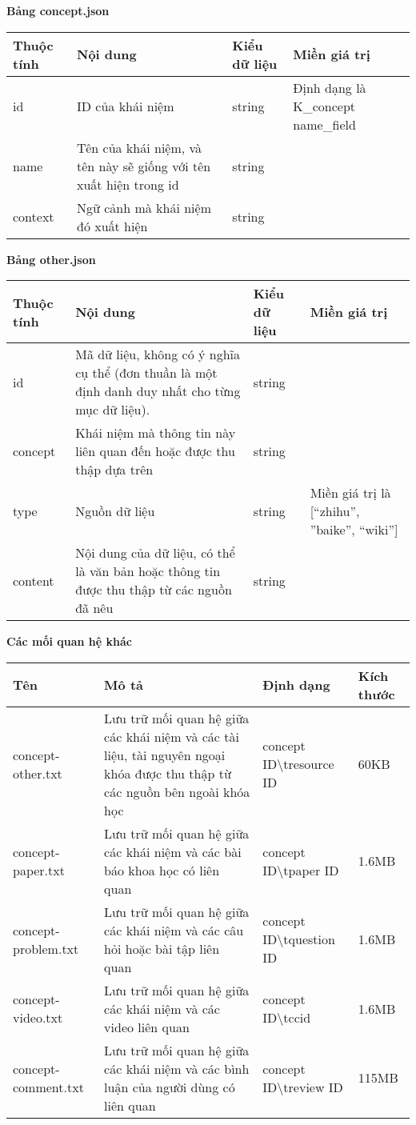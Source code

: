 %
\textbf{Bảng concept.json}
\begin{center}
\begin{tabular}{|| m{6em}  m{8em}  m{6em}  m{11em}||} 
 \hline
 \textbf{Thuộc tính} & \textbf{Nội dung} & \textbf{Kiểu dữ liệu} & \textbf{Miền giá trị} \\ [0.5ex] 
 \hline\hline
id &ID của khái niệm & string &Định dạng là K\_{concept name}\_{field}\\
 \hline
name & Tên của khái niệm, và tên này sẽ giống với tên xuất hiện trong id & string & \\
 \hline
context &Ngữ cảnh mà khái niệm đó xuất hiện  &string &\\ [1ex] 
 \hline
\end{tabular}
\end{center}
%
\textbf{Bảng other.json}
\begin{center}
\begin{tabular}{|| m{6em}  m{8em}  m{6em}  m{11em}||} 
 \hline
 \textbf{Thuộc tính} & \textbf{Nội dung} & \textbf{Kiểu dữ liệu} & \textbf{Miền giá trị} \\ [0.5ex] 
 \hline\hline
id &Mã dữ liệu, không có ý nghĩa cụ thể (đơn thuần là một định danh duy nhất cho từng mục dữ liệu). & string &\\
 \hline
concept &Khái niệm mà thông tin này liên quan đến hoặc được thu thập dựa trên & string &\\
 \hline
type & Nguồn dữ liệu & string & Miền giá trị là [“zhihu”, ”baike”, “wiki”]\\
 \hline
content &Nội dung của dữ liệu, có thể là văn bản hoặc thông tin được thu thập từ các nguồn đã nêu  &string &\\ [1ex] 
 \hline
\end{tabular}
\end{center}
%
\textbf{Các mối quan hệ khác}
\begin{center}
\begin{tabular}{|| m{5em}  m{10em}  m{11em}  m{6em}||} 
 \hline
 \textbf{Tên} & \textbf{Mô tả} & \textbf{Định dạng} & \textbf{Kích thước} \\ [0.5ex] 
 \hline\hline
concept-other.txt & Lưu trữ mối quan hệ giữa các khái niệm và các tài liệu, tài nguyên ngoại khóa được thu thập từ các nguồn bên ngoài khóa học & {concept ID}\textbackslash t{resource ID} &60KB \\
 \hline
 concept-paper.txt &Lưu trữ mối quan hệ giữa các khái niệm và các bài báo khoa học có liên quan & {concept ID}\textbackslash t{paper ID} & 1.6MB \\ \hline
 concept-problem.txt & Lưu trữ mối quan hệ giữa các khái niệm và các câu hỏi hoặc bài tập liên quan & {concept ID}\textbackslash t{question ID} & 1.6MB \\ \hline
 concept-video.txt& Lưu trữ mối quan hệ giữa các khái niệm và các video liên quan  & {concept ID}\textbackslash t{ccid} & 1.6MB \\ \hline
 concept-comment.txt& Lưu trữ mối quan hệ giữa các khái niệm và các bình luận của người dùng có liên quan & {concept ID}\textbackslash t{review ID} &115MB  \\ [1ex] 
 \hline
\end{tabular}
\end{center}
